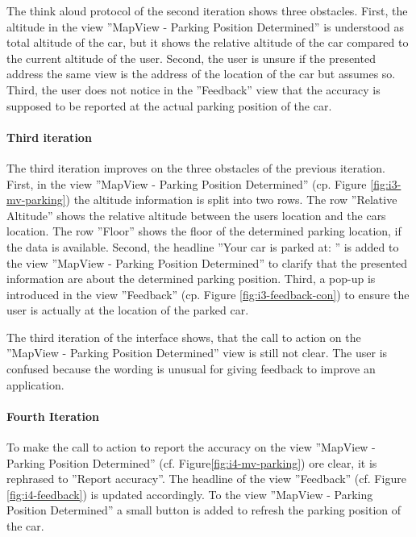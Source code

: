 The think aloud protocol of the second iteration shows three obstacles. First, the altitude in the view ''MapView - Parking Position Determined'' is understood as total altitude of the car, but it shows the relative altitude of the car compared to the current altitude of the user. Second, the user is unsure if the presented address the same view is the address of the location of the car but assumes so. Third, the user does not notice in the ''Feedback'' view that the accuracy is supposed to be reported at the actual parking position of the car.


\paragraph{Third iteration}

The third iteration improves on the three obstacles of the previous iteration. 
First, in the view ''MapView - Parking Position Determined'' (cp. Figure \ref{fig:i3-mv-parking}) the altitude information is split  into two rows. The row ''Relative Altitude'' shows the relative altitude between the users location and the cars location. The row ''Floor'' shows the floor of the determined parking location, if the data is available. Second, the headline ''Your car is parked at: '' is added to the view ''MapView - Parking Position Determined'' to clarify that the presented information are about the determined parking position. Third, a pop-up is introduced in the view ''Feedback'' (cp. Figure \ref{fig:i3-feedback-con}) to ensure the user is actually at the location of the parked car. 

The third iteration of the interface shows, that the call to action on the ''MapView - Parking Position Determined'' view is still not clear. The user is confused because the wording is unusual for giving feedback to improve an application.

\paragraph{Fourth Iteration}

To make the call to action to report the accuracy on the view ''MapView - Parking Position Determined'' (cf. Figure\ref{fig:i4-mv-parking}) ore clear, it is rephrased to ''Report accuracy''. The headline of the view ''Feedback'' (cf. Figure \ref{fig:i4-feedback}) is updated accordingly. To the view ''MapView - Parking Position Determined'' a small button is added to refresh the parking position of the car. 


